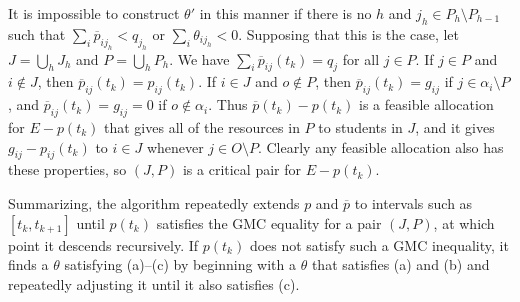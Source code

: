\documentclass[12pt]{article}
\theoremstyle{definition}
\newcommand{\barp}{\overline{p}}
\begin{document}
\begin{appendix}
It is impossible to construct $\theta'$ in this manner if there is no
$h$ and $j_h \in P_h \setminus P_{h-1}$ such that $\sum_i \barp_{ij_h}
< q_{j_h}$ or $\sum_i \theta_{ij_h} < 0$.  Supposing that this is the
case, let $J = \bigcup_h J_h$ and $P = \bigcup_h P_h$.  We have
$\sum_i \barp_{ij}(t_k) = q_j$ for all $j \in P$.  If $j \in P$ and $i
\notin J$, then $\barp_{ij}(t_k) = p_{ij}(t_k)$.  If $i \in J$ and $o
\notin P$, then $\barp_{ij}(t_k) = g_{ij}$ if $j \in \alpha_i
\setminus P$, and $\barp_{ij}(t_k) = g_{ij} = 0$ if $o \notin
\alpha_i$. Thus $\barp(t_k) - p(t_k)$ is a feasible allocation for $E
- p(t_k)$ that gives all of the resources in $P$ to students in $J$,
and it gives $g_{ij} - p_{ij}(t_k)$ to $i \in J$ whenever $j \in O
\setminus P$. Clearly any feasible allocation also has these
properties, so $(J,P)$ is a critical pair for $E - p(t_k)$.

Summarizing, the algorithm repeatedly extends $p$ and $\barp$ to
intervals such as $[t_k,t_{k+1}]$ until $p(t_k)$ satisfies the GMC
equality for a pair $(J,P)$, at which point it descends
recursively. If $p(t_k)$ does not satisfy such a GMC inequality, it
finds a $\theta$ satisfying (a)--(c) by beginning with a $\theta$ that
satisfies (a) and (b) and repeatedly adjusting it until it also
satisfies (c).


\end{appendix}
\end{document}
